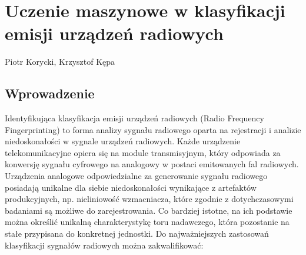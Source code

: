 \chapter[Uczenie maszynowe \ldots]{Uczenie maszynowe w klasyfikacji emisji urządzeń radiowych}
\label{rffp} %

\thispagestyle{empty}
\vspace{-8mm} {\large Piotr Korycki, Krzysztof Kępa} \vspace{8mm}

\section{Wprowadzenie}
Identyfikująca klasyfikacja emisji urządzeń radiowych (Radio Frequency Fingerprinting) to forma analizy sygnału radiowego oparta na rejestracji i analizie niedoskonałości w sygnale urządzeń radiowych. Każde urządzenie telekomunikacyjne opiera się na module transmisyjnym, który odpowiada za konwersję sygnału cyfrowego na analogowy w postaci emitowanych fal radiowych. Urządzenia analogowe odpowiedzialne za generowanie sygnału radiowego posiadają unikalne dla siebie niedoskonałości wynikające z artefaktów produkcyjnych, np. nieliniowość wzmacniacza, które zgodnie z dotychczasowymi badaniami \cite{rf_fingerprinting_sciencedirect} są możliwe do zarejestrowania. Co bardziej istotne, na ich podstawie można określić unikalną charakterystykę toru nadawczego, która pozostanie na stałe przypisana do konkretnej jednostki. Do najważniejszych zastosowań klasyfikacji sygnałów radiowych można zakwalifikować:

